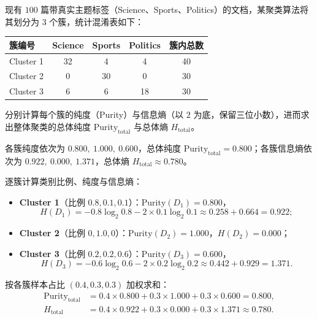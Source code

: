 \begin{exercise}[title={文档聚类外部评价：Purity 与 Entropy 手算},level=standard,points=12,tags={聚类评价,Purity,Entropy}]
现有 $100$ 篇带真实主题标签（Science、Sports、Politics）的文档，某聚类算法将其划分为 $3$ 个簇，统计混淆表如下：
\begin{center}
  \small
  \begin{tabular}{@{}lcccc@{}}
    \toprule
    簇编号 & Science & Sports & Politics & 簇内总数 \\
    \midrule
    Cluster 1 & 32 & 4  & 4  & 40 \\
    Cluster 2 & 0  & 30 & 0  & 30 \\
    Cluster 3 & 6  & 6  & 18 & 30 \\
    \bottomrule
  \end{tabular}
\end{center}
分别计算每个簇的纯度（Purity）与信息熵（以 $2$ 为底，保留三位小数），进而求出整体聚类的总体纯度 $\mathrm{Purity}_{\text{total}}$ 与总体熵 $H_{\text{total}}$。
\begin{answer}
各簇纯度依次为 $0.800,\ 1.000,\ 0.600$，总体纯度 $\mathrm{Purity}_{\text{total}} = 0.800$；各簇信息熵依次为 $0.922,\ 0.000,\ 1.371$，总体熵 $H_{\text{total}} \approx 0.780$。
\end{answer}
\begin{solution}
逐簇计算类别比例、纯度与信息熵：
\begin{itemize}
  \item \textbf{Cluster 1}（比例 $0.8, 0.1, 0.1$）：$\mathrm{Purity}(D_1) = 0.800$，
  \[
    H(D_1) = -0.8\log_2 0.8 - 2\times 0.1\log_2 0.1 \approx 0.258 + 0.664 = 0.922;
  \]
  \item \textbf{Cluster 2}（比例 $0, 1.0, 0$）：$\mathrm{Purity}(D_2) = 1.000$，$H(D_2) = 0.000$；
  \item \textbf{Cluster 3}（比例 $0.2, 0.2, 0.6$）：$\mathrm{Purity}(D_3) = 0.600$，
  \[
    H(D_3) = -0.6\log_2 0.6 - 2\times 0.2\log_2 0.2 \approx 0.442 + 0.929 = 1.371.
  \]
\end{itemize}
按各簇样本占比 $(0.4, 0.3, 0.3)$ 加权求和：
\[\begin{aligned}
  \mathrm{Purity}_{\text{total}} &= 0.4\times 0.800 + 0.3\times 1.000 + 0.3\times 0.600 = 0.800,\\
  H_{\text{total}} &= 0.4\times 0.922 + 0.3\times 0.000 + 0.3\times 1.371 \approx 0.780.
\end{aligned}\]
\end{solution}
\end{exercise}

